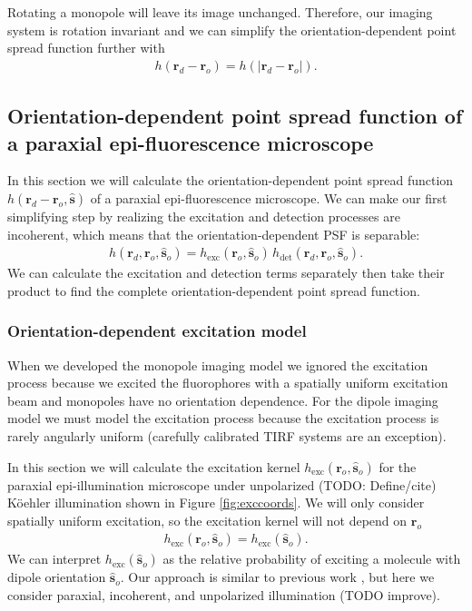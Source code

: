 \documentclass[]{osa-article}
\providecommand{\ro}{\mathbf{\mathbf{r}}_o}
\providecommand{\so}{\mathbf{\hat{s}}_o}
\providecommand{\rd}{\mathbf{r}_d}
\providecommand{\mh}[1]{\mathbf{\hat{#1}}}
\begin{document}
Rotating a monopole will leave its image unchanged. Therefore, our imaging
system is rotation invariant and we can simplify the orientation-dependent point spread function further with
\begin{align}
  h(\rd - \ro) = h(|\rd - \ro|). \label{eq:rotational}
\end{align}

\subsection{Orientation-dependent point spread function of a paraxial epi-fluorescence microscope}
In this section we will calculate the orientation-dependent point spread
function $h(\rd - \ro, \mh{s})$ of a paraxial epi-fluorescence microscope. We can
make our first simplifying step by realizing the excitation and detection
processes are incoherent, which means that the orientation-dependent PSF is
separable:
\begin{align}
  h(\rd, \ro, \so) = h_{\text{exc}}(\ro, \so)\,h_{\text{det}}(\rd, \ro, \so). \label{eq:kernelsep}
\end{align}
We can calculate the excitation and detection terms separately then take their
product to find the complete orientation-dependent point spread function.

\subsubsection{Orientation-dependent excitation model}
When we developed the monopole imaging model we ignored the excitation process
because we excited the fluorophores with a spatially uniform excitation beam and
monopoles have no orientation dependence. For the dipole imaging model we must
model the excitation process because the excitation process is rarely angularly
uniform (carefully calibrated TIRF systems are an exception).

In this section we will calculate the excitation kernel
$h_{\text{exc}}(\ro, \so)$ for the paraxial epi-illumination microscope under
unpolarized (TODO: Define/cite) K\"{o}ehler illumination shown in Figure
\ref{fig:exccoords}. We will only consider spatially uniform excitation, so the
excitation kernel will not depend on $\ro$
\begin{align}
  h_{\text{exc}}(\ro, \so) = h_{\text{exc}}(\so).
\end{align}
We can interpret $h_{\text{exc}}(\so)$ as the relative probability of exciting a
molecule with dipole orientation $\so$. Our approach is similar to previous work
\cite{fourkas2001, chandler2017}, but here we consider paraxial, incoherent, and
unpolarized illumination (TODO improve).
\end{document}
